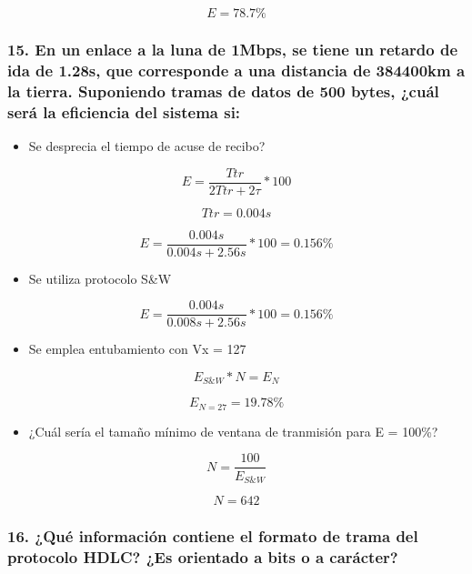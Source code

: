 \documentclass{article}
\begin{document}
\[ E = 78.7\% \]

\subsubsection{15. En un enlace a la luna de 1Mbps, se tiene un retardo
de ida de 1.28s, que corresponde a una distancia de 384400km a la
tierra. Suponiendo tramas de datos de 500 bytes, ¿cuál será la
eficiencia del sistema
si:}\label{en-un-enlace-a-la-luna-de-1mbps-se-tiene-un-retardo-de-ida-de-1.28s-que-corresponde-a-una-distancia-de-384400km-a-la-tierra.-suponiendo-tramas-de-datos-de-500-bytes-cuuxe1l-seruxe1-la-eficiencia-del-sistema-si}

\begin{itemize}
\itemsep1pt\parskip0pt
\item
  Se desprecia el tiempo de acuse de recibo?
\end{itemize}

\[ E = \dfrac{Ttr}{2Ttr + 2\tau} * 100 \]

\[ Ttr = 0.004s \]

\[ E = \dfrac{0.004s}{0.004s + 2.56s} * 100 = 0.156\% \]

\begin{itemize}
\itemsep1pt\parskip0pt
\item
  Se utiliza protocolo S\&W
\end{itemize}

\[ E = \dfrac{0.004s}{0.008s + 2.56s} * 100 = 0.156\% \]

\begin{itemize}
\itemsep1pt\parskip0pt
\item
  Se emplea entubamiento con Vx = 127
\end{itemize}

\[ E_{S\&W} * N = E_{N} \]

\[ E_{N=27} = 19.78\% \]

\begin{itemize}
\itemsep1pt\parskip0pt
\item
  ¿Cuál sería el tamaño mínimo de ventana de tranmisión para E = 100\%?
\end{itemize}

\[ N = \dfrac{100}{E_{S\&W}} \]

\[ N = 642 \]

\subsubsection{16. ¿Qué información contiene el formato de trama del
protocolo HDLC? ¿Es orientado a bits o a
carácter?}\label{quuxe9-informaciuxf3n-contiene-el-formato-de-trama-del-protocolo-hdlc-es-orientado-a-bits-o-a-caruxe1cter}
\end{document}
